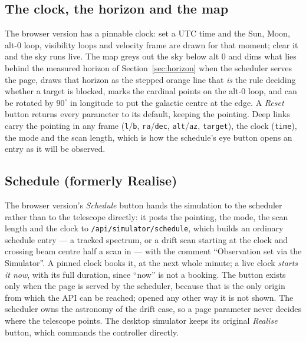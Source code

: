 \documentclass[11pt,a4paper]{article}
\begin{document}
\subsection{The clock, the horizon and the map}

The browser version has a pinnable clock: set a UTC time and the Sun, Moon, alt-0 loop, visibility loops and velocity frame are drawn for that moment; clear it and the sky runs live. The map greys out the sky below alt 0 and dims what lies behind the measured horizon of Section~\ref{sec:horizon} when the scheduler serves the page, draws that horizon as the stepped orange line that \emph{is} the rule deciding whether a target is blocked, marks the cardinal points on the alt-0 loop, and can be rotated by $90^\circ$ in longitude to put the galactic centre at the edge. A \emph{Reset} button returns every parameter to its default, keeping the pointing. Deep links carry the pointing in any frame (\texttt{l}/\texttt{b}, \texttt{ra}/\texttt{dec}, \texttt{alt}/\texttt{az}, \texttt{target}), the clock (\texttt{time}), the mode and the scan length, which is how the schedule's eye button opens an entry as it will be observed.

\subsection{Schedule (formerly Realise)}

The browser version's \emph{Schedule} button hands the simulation to the scheduler rather than to the telescope directly: it posts the pointing, the mode, the scan length and the clock to \texttt{/api/simulator/schedule}, which builds an ordinary schedule entry --- a tracked spectrum, or a drift scan starting at the clock and crossing beam centre half a scan in --- with the comment ``Observation set via the Simulator''. A pinned clock books it, at the next whole minute; a live clock \emph{starts it now}, with its full duration, since ``now'' is not a booking. The button exists only when the page is served by the scheduler, because that is the only origin from which the API can be reached; opened any other way it is not shown. The scheduler owns the astronomy of the drift case, so a page parameter never decides where the telescope points. The desktop simulator keeps its original \emph{Realise} button, which commands the controller directly.

\end{document}
